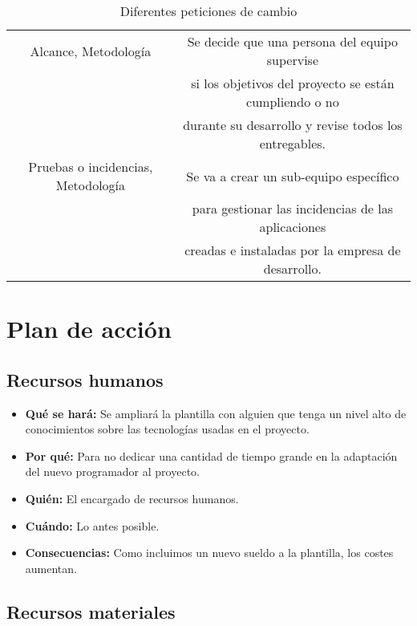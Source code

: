 \begin{table}[H]
\begin{center}
\begin{tabular}{|c|c|}
			Alcance, Metodología & Se decide que una persona del equipo supervise  \\ 
			& si los objetivos del proyecto se están cumpliendo o no \\ 
			& durante su desarrollo y revise todos los entregables.\\ \hline
			Pruebas o incidencias, Metodología & Se va a crear un sub-equipo específico  \\ 
			& para gestionar las incidencias de las aplicaciones \\ 
			& creadas e instaladas por la empresa de desarrollo. \\ \bottomrule
		\end{tabular}
	\end{center}
	\caption{Diferentes peticiones de cambio}
	\label{peticionesCambio}
\end{table}

\section{Plan de acción}

\subsection{Recursos humanos}

\begin{itemize}
	\item \textbf{Qué se hará: } Se ampliará la plantilla con alguien que tenga un nivel alto de conocimientos sobre las tecnologías usadas en el proyecto. 
	\item \textbf{Por qué: } Para no dedicar una cantidad de tiempo grande en la adaptación del nuevo programador al proyecto.
	\item \textbf{Quién: } El encargado de recursos humanos.
	\item \textbf{Cuándo: } Lo antes posible.
	\item \textbf{Consecuencias: } Como incluimos un nuevo sueldo a la plantilla, los costes aumentan.
\end{itemize}

\subsection{Recursos materiales}

